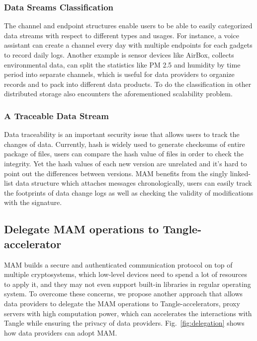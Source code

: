 \documentclass[conference]{IEEEtran}
\begin{document}
\subsubsection{Data Sreams Classification}
The channel and endpoint structures enable users to be able to easily categorized data streams with respect to different types and usages. For instance, a voice assistant can create a channel every day with multiple endpoints for each gadgets to record daily logs. Another example is sensor devices like AirBox\cite{LASS}, collects environmental data, can split the statistics like PM 2.5 and humidity by time period into separate channels, which is useful for data providers to organize records and to pack into different data products. To do the classification in other distributed storage also encounters the aforementioned scalability problem.

\subsubsection{A Traceable Data Stream}
Data traceability is an important security issue that allows users to track the changes of data. Currently, hash is widely used to generate checksums of entire package of files, users can compare the hash value of files in order to check the integrity. Yet the hash values of each new version are unrelated and it's hard to point out the differences between versions. MAM benefits from the singly linked-list data structure which attaches messages chronologically, users can easily track the footprints of data change logs as well as checking the validity of modifications with the signature.

\subsection{Delegate MAM operations to Tangle-accelerator}
\label{section:ta_endpoint}
MAM builds a secure and authenticated communication protocol on top of multiple cryptosystems, which low-level devices need to spend a lot of resources to apply it, and they may not even support built-in libraries in regular operating system. To overcome these concerns, we propose another approach that allows data providers to delegate the MAM operations to Tangle-accelerators, proxy servers with high computation power, which can accelerates the interactions with Tangle while ensuring the privacy of data providers. Fig.~\ref{fig:delegation} shows how data providers can adopt MAM.
\end{document}
